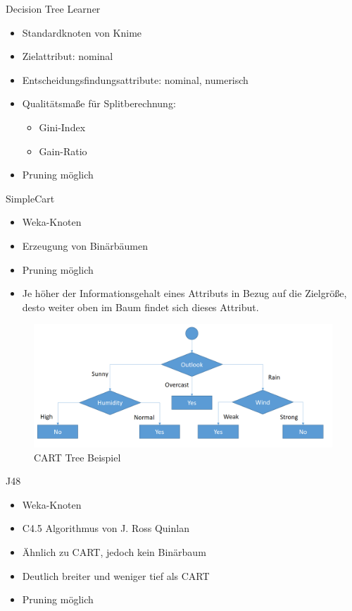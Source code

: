 \documentclass[
	handout,
  	aspectratio=169
]{beamer}
\begin{document}
		\begin{frame}{Decision Tree Learner}
			\begin{itemize}
				\item Standardknoten von Knime
				\item Zielattribut: nominal
				\item Entscheidungsfindungsattribute: nominal, numerisch
				\item Qualitätsmaße für Splitberechnung:
				\begin{itemize}
					\item Gini-Index
					\item Gain-Ratio
				\end{itemize}
				\item Pruning möglich
			\end{itemize}
		\end{frame}

		\begin{frame}{SimpleCart}	
			\begin{itemize}
				\item Weka-Knoten
				\item Erzeugung von Binärbäumen
				\item Pruning möglich
				\item Je höher der Informationsgehalt eines Attributs in Bezug auf die Zielgröße, desto weiter oben im Baum findet
sich dieses Attribut. 
			\end{itemize}
			\begin{center}
				\begin{figure}[h]
					\includegraphics[scale=0.2]{../pictures/cart-tree.png}
					\caption{CART Tree Beispiel}		
				\end{figure}		
			\end{center}
		\end{frame}

		\begin{frame}{J48}		
			\begin{itemize}
				\item Weka-Knoten
				\item C4.5 Algorithmus von J. Ross Quinlan
				\item Ähnlich zu CART, jedoch kein Binärbaum
				\item Deutlich breiter und weniger tief als CART
				\item Pruning möglich
			\end{itemize}
		\end{frame}
\end{document}
